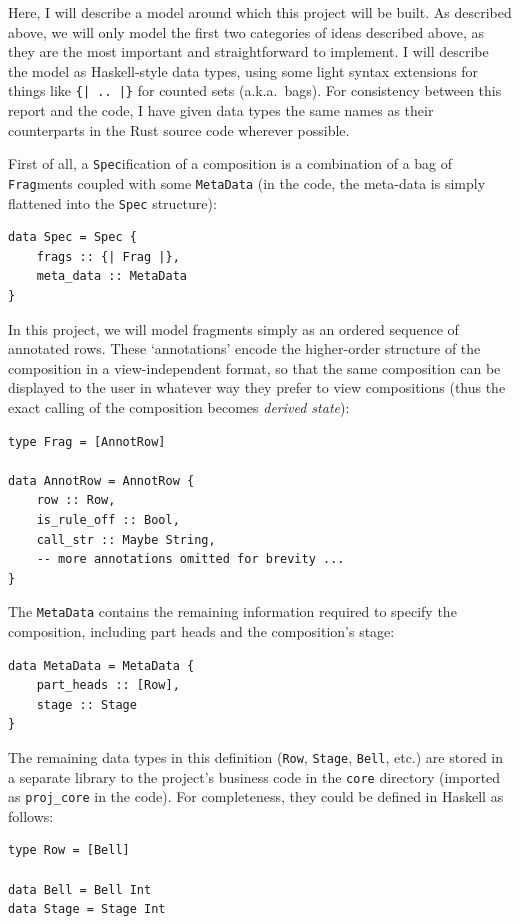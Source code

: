 \documentclass[12pt]{article}
\begin{document}
Here, I will describe a model around which this project will be built.  As described above, we will
only model the first two categories of ideas described above, as they are the most important and
straightforward to implement.  I will describe the model as Haskell-style data types, using some
light syntax extensions for things like \verb+{| .. |}+ for counted sets (a.k.a.\ bags).  For
consistency between this report and the code, I have given data types the same
names as their counterparts in the Rust source code wherever possible.

First of all, a \verb|Spec|ification of a composition is a combination of a bag of \verb|Frag|ments
coupled with some \verb|MetaData| (in the code, the meta-data is simply flattened into the
\verb|Spec| structure):

\begin{verbatim}
data Spec = Spec {
    frags :: {| Frag |},
    meta_data :: MetaData
}
\end{verbatim}

In this project, we will model fragments simply as an ordered sequence of annotated rows.  These
`annotations' encode the higher-order structure of the composition in a view-independent format,
so that the same composition can be displayed to the user in whatever way they prefer to view
compositions (thus the exact calling of the composition becomes \emph{derived state}):

\begin{verbatim}
type Frag = [AnnotRow]

data AnnotRow = AnnotRow {
    row :: Row,
    is_rule_off :: Bool,
    call_str :: Maybe String,
    -- more annotations omitted for brevity ...
}
\end{verbatim}

The \verb|MetaData| contains the remaining information required to specify the composition,
including part heads and the composition's stage:

\begin{verbatim}
data MetaData = MetaData {
    part_heads :: [Row],
    stage :: Stage
}
\end{verbatim}

The remaining data types in this definition (\verb|Row|, \verb|Stage|, \verb|Bell|, etc.) are stored
in a separate library to the project's business code in the \verb|core| directory (imported as
\verb|proj_core| in the code).  For completeness, they could be defined in Haskell as follows:

\begin{verbatim}
type Row = [Bell]

data Bell = Bell Int
data Stage = Stage Int
\end{verbatim}
\end{document}

